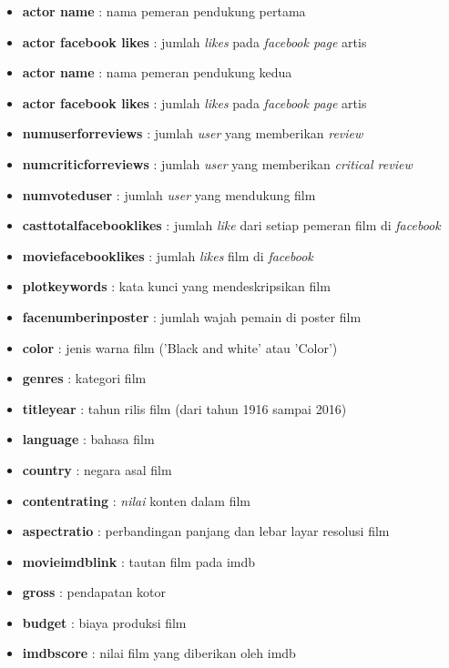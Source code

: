 \documentclass[a4paper,twoside]{article}
\begin{document}
\begin{enumerate}
\begin{itemize}
\item	\textbf{actor  \textunderscore name} : nama pemeran pendukung pertama 
\item	\textbf{actor  \textunderscore facebook \textunderscore likes} : jumlah \textit{likes} pada \textit{facebook page} artis 

\item	\textbf{actor  \textunderscore name} : nama pemeran pendukung kedua  
\item	\textbf{actor  \textunderscore facebook \textunderscore likes} : jumlah \textit{likes} pada \textit{facebook page} artis 


\item \textbf{num\textunderscore user\textunderscore for\textunderscore reviews} : jumlah \textit{user} yang memberikan \textit{review}
\item \textbf{num\textunderscore critic\textunderscore for\textunderscore reviews} : jumlah \textit{user} yang memberikan \textit{critical review}
\item \textbf{num\textunderscore voted\textunderscore user} : jumlah \textit{user} yang mendukung film
\item \textbf{cast\textunderscore total\textunderscore facebook\textunderscore likes} : jumlah \textit{like} dari setiap pemeran film di \textit{facebook}

\item \textbf{movie\textunderscore facebook\textunderscore likes} : jumlah \textit{likes} film di \textit{facebook}
\item \textbf{plot\textunderscore keywords} : kata kunci yang mendeskripsikan film 
\item \textbf{facenumber\textunderscore in\textunderscore poster} : jumlah wajah pemain di poster film 
\item \textbf{color} : jenis warna film ('Black and white' atau 'Color')
\item \textbf{genres}  : kategori film 
\item \textbf{title\textunderscore year} : tahun rilis film (dari tahun 1916 sampai 2016)

\item \textbf{language} : bahasa film 
\item \textbf{country} : negara asal film 
\item \textbf{content\textunderscore rating} : \textit{nilai} konten dalam film 
\item \textbf{aspect\textunderscore ratio} : perbandingan panjang dan lebar layar resolusi film 
\item \textbf{movie\textunderscore imdb\textunderscore link} : tautan film pada imdb 
\item \textbf{gross} : pendapatan kotor 
\item \textbf{budget} : biaya produksi film 
\item \textbf{imdb\textunderscore score} : nilai film yang diberikan oleh imdb 
\end{itemize}


\end{enumerate}
\end{document}
